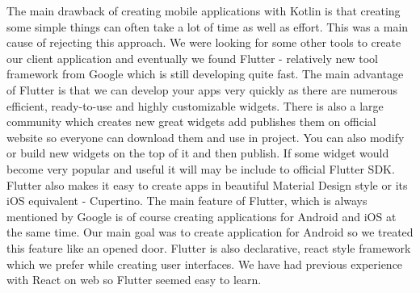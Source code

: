 \documentclass[../Main.tex]{subfiles}
\begin{document}
        The main drawback of creating mobile applications with Kotlin is that creating
        some simple things can often take a lot of time as well as effort. 
        This was a main cause of rejecting this approach.
        We were looking for some other tools to create our client application and 
        eventually we found Flutter - relatively new tool framework from Google which 
        is still developing quite fast.
        The main advantage of Flutter is that we can develop your apps very 
        quickly as there are numerous efficient, ready-to-use and highly customizable 
        widgets. There is also a large community which creates new great widgets 
        add publishes them on official website so everyone can download them and use in project.
        You can also modify or build new widgets on the top of it and then publish.
        If some widget would become very popular and useful it will may be 
        include to official Flutter SDK. 
        Flutter also makes it easy to create apps in beautiful Material Design 
        style or its iOS equivalent - Cupertino. 
        The main feature of Flutter, which is always mentioned by Google is of course 
        creating applications for Android and iOS at the same time. 
        Our main goal was to create application for Android so we treated this feature like 
        an opened door. 
        Flutter is also declarative, react style framework which we prefer while
        creating user interfaces. We have had previous experience with React on web
        so Flutter seemed easy to learn. 
    

\biblio %
\end{document}
